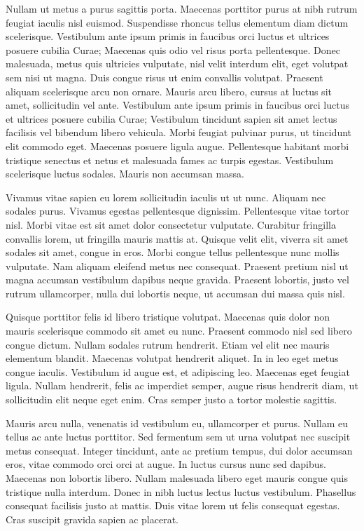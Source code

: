 \documentclass[a4paper]{article}
\begin{document}
Nullam ut metus a purus sagittis porta. Maecenas porttitor purus at nibh rutrum feugiat iaculis nisl euismod. Suspendisse rhoncus tellus elementum diam dictum scelerisque. Vestibulum ante ipsum primis in faucibus orci luctus et ultrices posuere cubilia Curae; Maecenas quis odio vel risus porta pellentesque. Donec malesuada, metus quis ultricies vulputate, nisl velit interdum elit, eget volutpat sem nisi ut magna. Duis congue risus ut enim convallis volutpat. Praesent aliquam scelerisque arcu non ornare. Mauris arcu libero, cursus at luctus sit amet, sollicitudin vel ante. Vestibulum ante ipsum primis in faucibus orci luctus et ultrices posuere cubilia Curae; Vestibulum tincidunt sapien sit amet lectus facilisis vel bibendum libero vehicula. Morbi feugiat pulvinar purus, ut tincidunt elit commodo eget. Maecenas posuere ligula augue. Pellentesque habitant morbi tristique senectus et netus et malesuada fames ac turpis egestas. Vestibulum scelerisque luctus sodales. Mauris non accumsan massa.

Vivamus vitae sapien eu lorem sollicitudin iaculis ut ut nunc. Aliquam nec sodales purus. Vivamus egestas pellentesque dignissim. Pellentesque vitae tortor nisl. Morbi vitae est sit amet dolor consectetur vulputate. Curabitur fringilla convallis lorem, ut fringilla mauris mattis at. Quisque velit elit, viverra sit amet sodales sit amet, congue in eros. Morbi congue tellus pellentesque nunc mollis vulputate. Nam aliquam eleifend metus nec consequat. Praesent pretium nisl ut magna accumsan vestibulum dapibus neque gravida. Praesent lobortis, justo vel rutrum ullamcorper, nulla dui lobortis neque, ut accumsan dui massa quis nisl.

Quisque porttitor felis id libero tristique volutpat. Maecenas quis dolor non mauris scelerisque commodo sit amet eu nunc. Praesent commodo nisl sed libero congue dictum. Nullam sodales rutrum hendrerit. Etiam vel elit nec mauris elementum blandit. Maecenas volutpat hendrerit aliquet. In in leo eget metus congue iaculis. Vestibulum id augue est, et adipiscing leo. Maecenas eget feugiat ligula. Nullam hendrerit, felis ac imperdiet semper, augue risus hendrerit diam, ut sollicitudin elit neque eget enim. Cras semper justo a tortor molestie sagittis.

Mauris arcu nulla, venenatis id vestibulum eu, ullamcorper et purus. Nullam eu tellus ac ante luctus porttitor. Sed fermentum sem ut urna volutpat nec suscipit metus consequat. Integer tincidunt, ante ac pretium tempus, dui dolor accumsan eros, vitae commodo orci orci at augue. In luctus cursus nunc sed dapibus. Maecenas non lobortis libero. Nullam malesuada libero eget mauris congue quis tristique nulla interdum. Donec in nibh luctus lectus luctus vestibulum. Phasellus consequat facilisis justo at mattis. Duis vitae lorem ut felis consequat egestas. Cras suscipit gravida sapien ac placerat.
\end{document}
